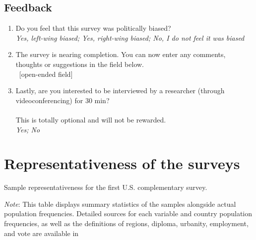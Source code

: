 \subsection*{Feedback}
\begin{enumerate}[resume]
\item Do you feel that this survey was politically biased?
\\ \textit{Yes, left-wing biased; Yes, right-wing biased; No, I do not feel it was biased}
\item The survey is nearing completion. You can now enter any comments, thoughts or suggestions in the field below.
\\ ~[open-ended field]
\item Lastly, are you interested to be interviewed by a researcher (through videoconferencing) for 30 min? \\
\\
This is totally optional and will not be rewarded.
\\ \textit{Yes; No}
\end{enumerate}

\clearpage
\section{Representativeness of the surveys}\label{app:representativeness}

\begin{table}[h]\label{tab:representativeness_US1}
    \caption{Sample representativeness for the first U.S. complementary survey.} 
    \makebox[\textwidth][c]{
        \resizebox*{!}{.65\textheight}{%
        
        }
    }
    {\footnotesize \textit{Note}: This table displays summary statistics of the samples alongside actual population frequencies. %
    Detailed sources for each variable and country population frequencies, as well as the definitions of regions, diploma, urbanity, employment, and vote are available in %
    }
\end{table}


